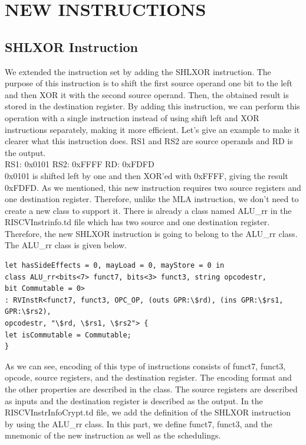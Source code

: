 \clearpage
\chapter{NEW INSTRUCTIONS}\label{Ch9}

\section{SHLXOR Instruction}
We extended the instruction set by adding the SHLXOR instruction. The purpose of this instruction is to shift the first source operand one bit to the left and then XOR it with the second source operand. Then, the obtained result is stored in the destination register. By adding this instruction, we can perform this operation with a single instruction instead of using shift left and XOR instructions separately, making it more efficient.
Let’s give an example to make it clearer what this instruction does. RS1 and RS2 are source operands and RD is the output.
\\
RS1: 0x0101     RS2: 0xFFFF     RD: 0xFDFD
\\
0x0101 is shifted left by one and then XOR’ed with 0xFFFF, giving the result 0xFDFD.
As we mentioned, this new instruction requires two source registers and one destination register. Therefore, unlike the MLA instruction, we don’t need to create a new class to support it. There is already a class named ALU\_rr in the RISCVInstrinfo.td file which has two source and one destination register. Therefore, the new SHLXOR instruction is going to belong to the ALU\_rr class. The ALU\_rr class is given below.

\begin{lstlisting}
let hasSideEffects = 0, mayLoad = 0, mayStore = 0 in
class ALU_rr<bits<7> funct7, bits<3> funct3, string opcodestr,
bit Commutable = 0>
: RVInstR<funct7, funct3, OPC_OP, (outs GPR:\$rd), (ins GPR:\$rs1, GPR:\$rs2),
opcodestr, "\$rd, \$rs1, \$rs2"> {
let isCommutable = Commutable;
}
\end{lstlisting}

As we can see, encoding of this type of instructions consists of funct7, funct3, opcode, source registers, and the destination register. The encoding format and the other properties are described in the class. The source registers are described as inputs and the destination register is described as the output.
In the RISCVInstrInfoCrypt.td file, we add the definition of the SHLXOR instruction by using the ALU\_rr class. In this part, we define funct7, funct3, and the mnemonic of the new instruction as well as the schedulings.

